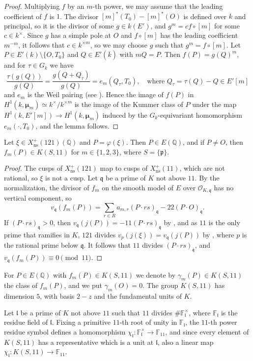 \documentclass[11pt,reqno]{amsart}
\newcommand{\Q}{\mathbb{Q}}
\newcommand{\F}{\mathbb{F}}
\newcommand{\OO}{\mathcal{O}}
\newcommand{\fp}{\mathfrak{p}}
\newcommand{\fq}{\mathfrak{q}}
\newcommand{\fl}{\mathfrak{l}}
\newcommand{\ns}{\mathrm{ns}}
\newcommand{\Xns}[1]{X_{\ns}^+(#1)}
\theoremstyle{definition}
\numberwithin{equation}{section}
\begin{document}
\begin{proof}
Multiplying $f$ by an $m$-th power, we may assume that the leading coefficient of $f$ is $1$. The divisor $[m]^*(T_0)-[m]^*(O)$ is defined over $k$ and principal, so it is the divisor of some $g\in k(E')$, and $g^m=cf\circ[m]$ for some $c\in k^\times$. Since $g$ has a simple pole at $O$ and $f\circ [m]$ has the leading coefficient $m^{-m}$, it follows that $c\in k^{\times m}$, so we may choose $g$ such that $g^m=f\circ[m]$. Let $P\in E'(k)\setminus\{O,T_0\}$ and $Q\in E'(\overline k)$ with $mQ=P$. Then $f(P)=g(Q)^m$, and for $\tau\in G_k$ we have
$$\frac{\tau(g(Q))}{g(Q)}=\frac{g(Q+Q_\tau)}{g(Q)}=e_m(Q_\tau,T_0),\quad\text{where } Q_\tau=\tau(Q)-Q\in E'[m]$$
and $e_m$ is the Weil pairing (see \cite[Section III.8]{Silverman}). Hence the image of $f(P)$ in $H^1(k,\boldsymbol\mu_m)\simeq k^\times/k^{\times m}$ is the image of the Kummer class of $P$ under the map $H^1(k,E'[m])\rightarrow H^1(k,\boldsymbol\mu_m)$ induced by the $G_k$-equivariant homomorphism $e_m(\cdot,T_0)$, and the lemma follows.
\end{proof}

\begin{corollary}\label{cor:integral}
Let $\xi\in \Xns{121}(\Q)$ and $P=\varphi(\xi)$. Then $P\in E(\Q)$, and if $P\neq O$, then $f_m(P)\in K(S,11)$ for $m\in\{1,2,3\}$, where $S=\{\fp\}$.
\end{corollary}

\begin{proof}
The cusps of $\Xns{121}$ map to cusps of $\Xns{11}$, which are not rational, so $\xi$ is not a cusp. Let $\fq$ be a prime of $K$ not above $11$. By the normalization, the divisor of $f_m$ on the smooth model of $E$ over $\OO_{K,\fq}$ has no vertical component, so
$$v_\fq(f_m(P))=\sum_{r\in R}a_{m,r}(P\cdot rs)_\fq-22(P\cdot O)_\fq.$$
If $(P\cdot rs)_\fq>0$, then $v_\fq(j(P))=-11(P\cdot rs)_\fq$ by , and as $11$ is the only prime that ramifies in $K$, $121$ divides $v_p(j(\xi))=v_\fq(j(P))$ by , where $p$ is the rational prime below $\fq$. It follows that $11$ divides $(P\cdot rs)_\fq$, and $v_\fq(f_m(P))\equiv 0\pmod{11}$.
\end{proof}

For $P\in E(\Q)$ with $f_m(P)\in K(S,11)$ we denote by $\gamma_m(P)\in K(S,11)$ the class of $f_m(P)$, and we put $\gamma_m(O)=0$. The group $K(S,11)$ has dimension $5$, with basis $2-z$ and the fundamental units of $K$.

Let $\fl$ be a prime of $K$ not above $11$ such that $11$ divides $\#\F_\fl^\times$, where $\F_\fl$ is the residue field of $\fl$. Fixing a primitive $11$-th root of unity in $\F_\fl$, the $11$-th power residue symbol defines a homomorphism $\chi_\fl\colon \F_\fl^\times\rightarrow \F_{11}$, and since every element of $K(S,11)$ has a representative which is a unit at $\fl$, also a linear map $\chi_\fl\colon K(S,11)\rightarrow \F_{11}$.
\end{document}
